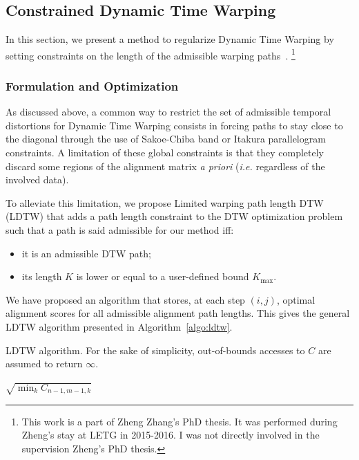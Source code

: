 \subsection{Constrained Dynamic Time Warping}

In this section, we present a method to regularize Dynamic Time Warping
by setting constraints on the length of the admissible warping
paths~\cite{zhang2017dynamic}.%
\footnote{This work is a part of Zheng Zhang's PhD thesis. It was performed
during Zheng's stay at LETG in 2015-2016.
I was not directly involved in the supervision Zheng's PhD thesis.}

\subsubsection{Formulation and Optimization}

As discussed above, a common way
to restrict the set of admissible temporal distortions for Dynamic Time Warping
consists in forcing paths to stay close to the diagonal through the use of
Sakoe-Chiba band or Itakura parallelogram constraints.
A limitation of these global constraints is that they completely
discard some regions of the alignment matrix \emph{a priori}
(\emph{i.e.} regardless of the involved data).

To alleviate this limitation, we propose Limited warping path length DTW (LDTW)
that adds a path length constraint to the DTW
optimization problem such that a path is said admissible for our method iff:

\begin{itemize}
\item it is an admissible DTW path;
\item its length $K$ is lower or equal to a user-defined bound $K_\text{max}$.
\end{itemize}

We have proposed an algorithm that stores, at each step $(i, j)$, optimal
alignment scores for all admissible alignment path lengths.
This gives the general LDTW algorithm presented in Algorithm~\ref{algo:ldtw}.

\begin{algorithm}[t]
 \caption{LDTW algorithm. For the sake of simplicity, out-of-bounds accesses to $C$ are assumed to return $\infty$.}
 \label{algo:ldtw}
  \Return $\sqrt{\min_{k} C_{n - 1, m - 1, k}}$
\end{algorithm}


